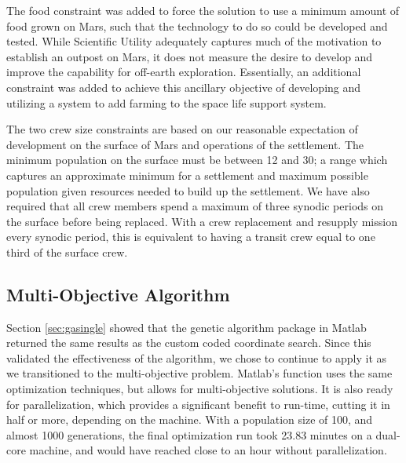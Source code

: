 \documentclass[]{aiaa-pretty}
\begin{document}
The food constraint was added to force the solution to use a minimum amount of food grown on Mars, such that the technology to do so could be developed and tested. While Scientific Utility adequately captures much of the motivation to establish an outpost on Mars, it does not measure the desire to develop and improve the capability for off-earth exploration. Essentially, an additional constraint was added to achieve this ancillary objective of developing and utilizing a system to add farming to the space life support system.

The two crew size constraints are based on our reasonable expectation of development on the surface of Mars and operations of the settlement. The minimum population on the surface must be between 12 and 30; a range which captures an approximate minimum for a settlement and maximum possible population given resources needed to build up the settlement. We have also required that all crew members spend a maximum of three synodic periods on the surface before being replaced. With a crew replacement and resupply mission every synodic period, this is equivalent to having a transit crew equal to one third of the surface crew.

\subsection{Multi-Objective Algorithm}
Section \ref{sec:gasingle} showed that the genetic algorithm package in Matlab returned the same results as the custom coded coordinate search. Since this validated the effectiveness of the  algorithm, we chose to continue to apply it as we transitioned to the multi-objective problem. Matlab's  function uses the same optimization techniques, but allows for multi-objective solutions. It is also ready for parallelization, which provides a significant benefit to run-time, cutting it in half or more, depending on the machine. With a population size of 100, and almost 1000 generations, the final optimization run took 23.83 minutes on a dual-core machine, and would have reached close to an hour without parallelization.
\end{document}
